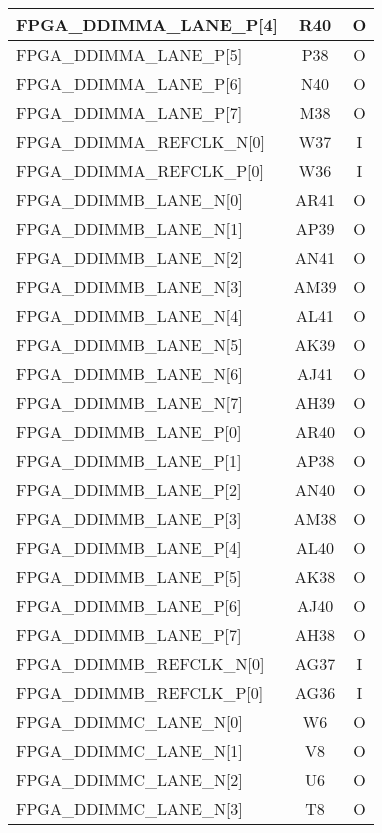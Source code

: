 \begin{longtable}[l]{| l | c | c |}
  FPGA\_DDIMMA\_LANE\_P[4]     & R40  & O   \\ \hline
  FPGA\_DDIMMA\_LANE\_P[5]     & P38  & O   \\ \hline
  FPGA\_DDIMMA\_LANE\_P[6]     & N40  & O   \\ \hline
  FPGA\_DDIMMA\_LANE\_P[7]     & M38  & O   \\ \hline
  FPGA\_DDIMMA\_REFCLK\_N[0]   & W37  & I   \\ \hline
  FPGA\_DDIMMA\_REFCLK\_P[0]   & W36  & I   \\ \hline
  FPGA\_DDIMMB\_LANE\_N[0]     & AR41 & O   \\ \hline
  FPGA\_DDIMMB\_LANE\_N[1]     & AP39 & O   \\ \hline
  FPGA\_DDIMMB\_LANE\_N[2]     & AN41 & O   \\ \hline
  FPGA\_DDIMMB\_LANE\_N[3]     & AM39 & O   \\ \hline
  FPGA\_DDIMMB\_LANE\_N[4]     & AL41 & O   \\ \hline
  FPGA\_DDIMMB\_LANE\_N[5]     & AK39 & O   \\ \hline
  FPGA\_DDIMMB\_LANE\_N[6]     & AJ41 & O   \\ \hline
  FPGA\_DDIMMB\_LANE\_N[7]     & AH39 & O   \\ \hline
  FPGA\_DDIMMB\_LANE\_P[0]     & AR40 & O   \\ \hline
  FPGA\_DDIMMB\_LANE\_P[1]     & AP38 & O   \\ \hline
  FPGA\_DDIMMB\_LANE\_P[2]     & AN40 & O   \\ \hline
  FPGA\_DDIMMB\_LANE\_P[3]     & AM38 & O   \\ \hline
  FPGA\_DDIMMB\_LANE\_P[4]     & AL40 & O   \\ \hline
  FPGA\_DDIMMB\_LANE\_P[5]     & AK38 & O   \\ \hline
  FPGA\_DDIMMB\_LANE\_P[6]     & AJ40 & O   \\ \hline
  FPGA\_DDIMMB\_LANE\_P[7]     & AH38 & O   \\ \hline
  FPGA\_DDIMMB\_REFCLK\_N[0]   & AG37 & I   \\ \hline
  FPGA\_DDIMMB\_REFCLK\_P[0]   & AG36 & I   \\ \hline
  FPGA\_DDIMMC\_LANE\_N[0]     & W6   & O   \\ \hline
  FPGA\_DDIMMC\_LANE\_N[1]     & V8   & O   \\ \hline
  FPGA\_DDIMMC\_LANE\_N[2]     & U6   & O   \\ \hline
  FPGA\_DDIMMC\_LANE\_N[3]     & T8   & O   \\ \hline

\end{longtable}
